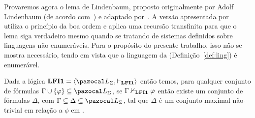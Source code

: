         Provaremos agora o lema de Lindenbaum, proposto originalmente por Adolf Lindenbaum (de acordo com~) e adaptado por~. A versão apresentada por~ utiliza o princípio da boa ordem e aplica uma recursão transfinita para que o lema siga verdadeiro mesmo quando se tratando de sistemas definidos sobre linguagens não enumeráveis. Para o propósito do presente trabalho, isso não se mostra necessário, tendo em vista que a linguagem da \lfium{} (Definição~\ref{def:ling}) é enumerável.

        \begin{lema}\label{lem:lindenbaum}
            Dada a lógica $\lfium{} = \langle \ling, \conhil \rangle$ então temos, para qualquer conjunto de fórmulas $\Gamma \cup \{\phi\} \subseteq \ling$, se $\Gamma \nvdash_{{\normalfont\textbf{LFI1}}{}} \varphi$ então existe um conjunto de fórmulas $\Delta$, com $\Gamma \subseteq \Delta \subseteq \ling$, tal que $\Delta$ é um conjunto maximal não-trivial em relação a $\phi$ em \lfium{}.
        \end{lema}

